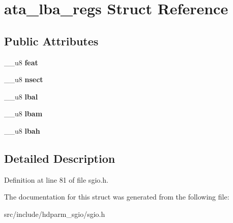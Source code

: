 \hypertarget{structata__lba__regs}{}\section{ata\+\_\+lba\+\_\+regs Struct Reference}
\label{structata__lba__regs}
\subsection*{Public Attributes}
\begin{DoxyCompactItemize}
\item 
\hypertarget{structata__lba__regs_a84bae7cc2ef1372772d761b10abbd701}{}\+\_\+\+\_\+u8 {\bfseries feat}\label{structata__lba__regs_a84bae7cc2ef1372772d761b10abbd701}

\item 
\hypertarget{structata__lba__regs_ac6c8371e005b71d2c2f0722cc15f6d8e}{}\+\_\+\+\_\+u8 {\bfseries nsect}\label{structata__lba__regs_ac6c8371e005b71d2c2f0722cc15f6d8e}

\item 
\hypertarget{structata__lba__regs_ab7b885757ea237dc8d0bf8d027122956}{}\+\_\+\+\_\+u8 {\bfseries lbal}\label{structata__lba__regs_ab7b885757ea237dc8d0bf8d027122956}

\item 
\hypertarget{structata__lba__regs_ad0a7eb79282bbb94d4846253ccf81da0}{}\+\_\+\+\_\+u8 {\bfseries lbam}\label{structata__lba__regs_ad0a7eb79282bbb94d4846253ccf81da0}

\item 
\hypertarget{structata__lba__regs_aaf0a596d9cead626abaeb2be700c3eed}{}\+\_\+\+\_\+u8 {\bfseries lbah}\label{structata__lba__regs_aaf0a596d9cead626abaeb2be700c3eed}

\end{DoxyCompactItemize}


\subsection{Detailed Description}


Definition at line 81 of file sgio.\+h.



The documentation for this struct was generated from the following file\+:\begin{DoxyCompactItemize}
\item 
src/include/hdparm\+\_\+sgio/sgio.\+h\end{DoxyCompactItemize}
